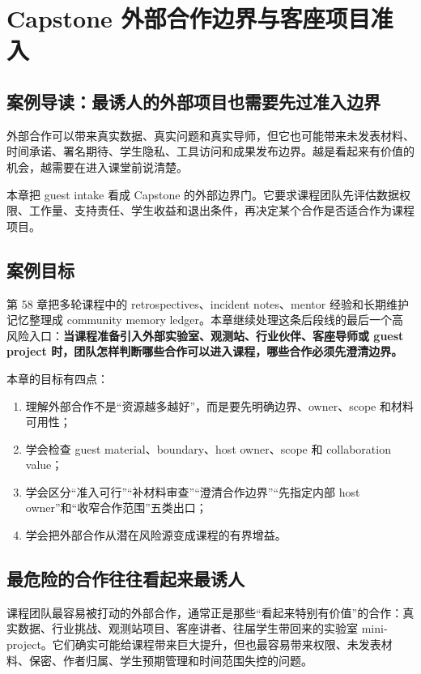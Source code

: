 \chapter{Capstone 外部合作边界与客座项目准入}

\section{案例导读：最诱人的外部项目也需要先过准入边界}

外部合作可以带来真实数据、真实问题和真实导师，但它也可能带来未发表材料、时间承诺、署名期待、学生隐私、工具访问和成果发布边界。越是看起来有价值的机会，越需要在进入课堂前说清楚。

本章把 guest intake 看成 Capstone 的外部边界门。它要求课程团队先评估数据权限、工作量、支持责任、学生收益和退出条件，再决定某个合作是否适合作为课程项目。

\section{案例目标}

第 58 章把多轮课程中的 retrospectives、incident notes、mentor 经验和长期维护记忆整理成 community memory ledger。本章继续处理这条后段线的最后一个高风险入口：\textbf{当课程准备引入外部实验室、观测站、行业伙伴、客座导师或 guest project 时，团队怎样判断哪些合作可以进入课程，哪些合作必须先澄清边界。}

本章的目标有四点：

\begin{enumerate}
    \item 理解外部合作不是“资源越多越好”，而是要先明确边界、owner、scope 和材料可用性；
    \item 学会检查 guest material、boundary、host owner、scope 和 collaboration value；
    \item 学会区分“准入可行”“补材料审查”“澄清合作边界”“先指定内部 host owner”和“收窄合作范围”五类出口；
    \item 学会把外部合作从潜在风险源变成课程的有界增益。
\end{enumerate}

\section{最危险的合作往往看起来最诱人}

课程团队最容易被打动的外部合作，通常正是那些“看起来特别有价值”的合作：真实数据、行业挑战、观测站项目、客座讲者、往届学生带回来的实验室 mini-project。它们确实可能给课程带来巨大提升，但也最容易带来权限、未发表材料、保密、作者归属、学生预期管理和时间范围失控的问题。

